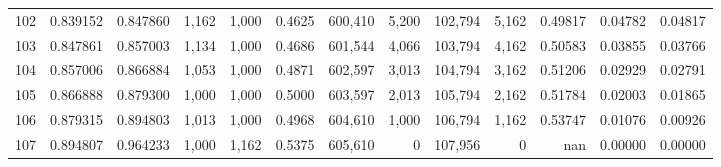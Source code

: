 \begin{tabular}{rrrrrrrrrrrrr}
102 &  0.839152 &  0.847860 &   1,162 &  1,000 &                                     0.4625 &  600,410 &    5,200 &  102,794 &    5,162 &  0.49817 &  0.04782 &  0.04817 \\
103 &  0.847861 &  0.857003 &   1,134 &  1,000 &                                     0.4686 &  601,544 &    4,066 &  103,794 &    4,162 &  0.50583 &  0.03855 &  0.03766 \\
104 &  0.857006 &  0.866884 &   1,053 &  1,000 &                                     0.4871 &  602,597 &    3,013 &  104,794 &    3,162 &  0.51206 &  0.02929 &  0.02791 \\
105 &  0.866888 &  0.879300 &   1,000 &  1,000 &                                     0.5000 &  603,597 &    2,013 &  105,794 &    2,162 &  0.51784 &  0.02003 &  0.01865 \\
106 &  0.879315 &  0.894803 &   1,013 &  1,000 &                                     0.4968 &  604,610 &    1,000 &  106,794 &    1,162 &  0.53747 &  0.01076 &  0.00926 \\
107 &  0.894807 &  0.964233 &   1,000 &  1,162 &                                     0.5375 &  605,610 &        0 &  107,956 &        0 &      nan &  0.00000 &  0.00000 \\
\bottomrule
\end{tabular}
